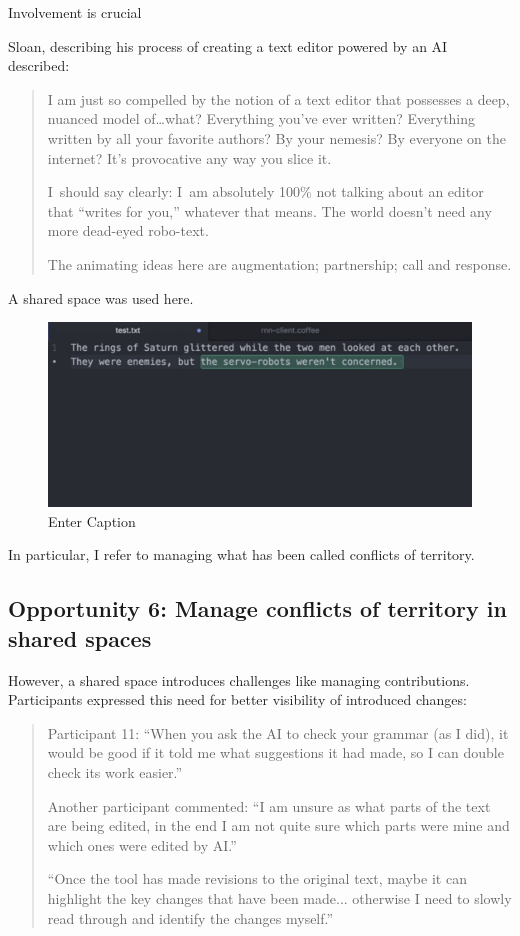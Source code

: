 Involvement is crucial

Sloan, describing his process of creating a text editor powered by an AI described:

\begin{quote}
I am just so compelled by the notion of a text editor that possesses a deep, nuanced model of…what? Everything you’ve ever written? Everything written by all your favorite authors? By your nemesis? By everyone on the internet? It’s provocative any way you slice it.

I should say clearly: I am absolutely 100\% not talking about an editor that “writes for you,” whatever that means. The world doesn’t need any more dead-eyed robo-text.

The animating ideas here are augmentation; partnership; call and response.
\end{quote}

A shared space was used here. 

\begin{figure}
    \centering
    \includegraphics[width=1\linewidth]{rnn.png}
    \caption{Enter Caption}
    \label{fig:enter-label}
\end{figure}


In particular, I refer to managing what has been called conflicts of territory. 

\subsection{Opportunity 6: Manage conflicts of territory in shared spaces}

However, a shared space introduces challenges like managing contributions. Participants expressed this need for better visibility of introduced changes:
\begin{quote}
Participant 11: “When you ask the AI to check your grammar (as I did), it would be good if it told me what suggestions it had made, so I can double check its work easier.”

Another participant commented: “I am unsure as what parts of the text are being edited, in the end I am not quite sure which parts were mine and which ones were edited by AI.”

“Once the tool has made revisions to the original text, maybe it can highlight the key changes that have been made... otherwise I need to slowly read through and identify the changes myself.”
\end{quote}


